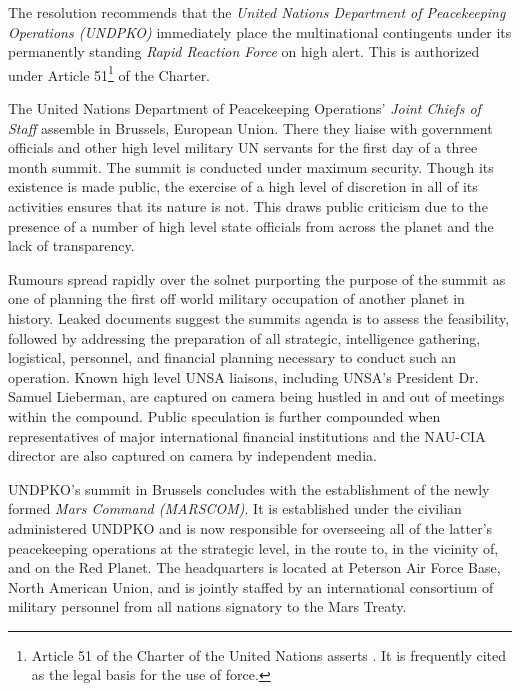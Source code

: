 The resolution recommends that the {\it United Nations Department of Peacekeeping Operations (UNDPKO)} immediately place the multinational contingents under its permanently standing {\it Rapid Reaction Force} on high alert. This is authorized under Article 51\footnote{Article 51 of the Charter of the United Nations asserts . It is frequently cited as the legal basis for the use of force.} of the Charter.
\StopTimelineDate

The United Nations Department of Peacekeeping Operations' {\it Joint Chiefs of Staff} assemble in Brussels, European Union. There they liaise with government officials and other high level military UN servants for the first day of a three month summit. The summit is conducted under maximum security. Though its existence is made public, the exercise of a high level of discretion in all of its activities ensures that its nature is not. This draws public criticism due to the presence of a number of high level state officials from across the planet and the lack of transparency.

Rumours spread rapidly over the solnet purporting the purpose of the summit as one of planning the first off world military occupation of another planet in history. Leaked documents suggest the summits agenda is to assess the feasibility, followed by addressing the preparation of all strategic, intelligence gathering, logistical, personnel, and financial planning necessary to conduct such an operation. Known high level UNSA liaisons, including UNSA's President Dr. Samuel Lieberman, are captured on camera being hustled in and out of meetings within the compound. Public speculation is further compounded when representatives of major international financial institutions and the NAU-CIA director are also captured on camera by independent media.
\StopTimelineDate

UNDPKO's summit in Brussels concludes with the establishment of the newly formed {\it Mars Command (MARSCOM)}. It is established under the civilian administered UNDPKO and is now responsible for overseeing all of the latter's peacekeeping operations at the strategic level, in the route to, in the vicinity of, and on the Red Planet. The headquarters is located at Peterson Air Force Base, North American Union, and is jointly staffed by an international consortium of military personnel from all nations signatory to the Mars Treaty.

